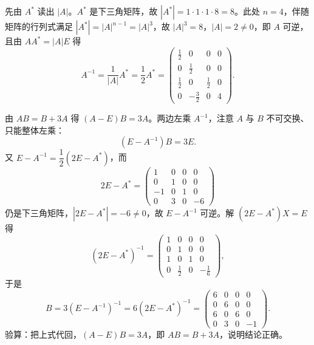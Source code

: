 \begin{solution}
先由 $A^{*}$ 读出 $|A|$。$A^{*}$ 是下三角矩阵，故 $|A^{*}|=1\cdot1\cdot1\cdot8=8$。此处 $n=4$，伴随矩阵的行列式满足 $|A^{*}|=|A|^{n-1}=|A|^{3}$，故 $|A|^{3}=8$，$|A|=2\ne0$，即 $A$ 可逆，且由 $AA^{*}=|A|E$ 得
\[
A^{-1}=\frac{1}{|A|}A^{*}=\frac12A^{*}
=\begin{pmatrix}
\frac12&0&0&0\\
0&\frac12&0&0\\
\frac12&0&\frac12&0\\
0&-\frac32&0&4
\end{pmatrix}.
\]

由 $AB=B+3A$ 得 $(A-E)B=3A$。两边左乘 $A^{-1}$，注意 $A$ 与 $B$ 不可交换、只能整体左乘：
\[
(E-A^{-1})B=3E .
\]
又 $E-A^{-1}=\dfrac12(2E-A^{*})$，而
\[
2E-A^{*}=\begin{pmatrix}1&0&0&0\\0&1&0&0\\-1&0&1&0\\0&3&0&-6\end{pmatrix}
\]
仍是下三角矩阵，$|2E-A^{*}|=-6\ne0$，故 $E-A^{-1}$ 可逆。解 $(2E-A^{*})X=E$ 得
\[
(2E-A^{*})^{-1}=\begin{pmatrix}1&0&0&0\\0&1&0&0\\1&0&1&0\\0&\frac12&0&-\frac16\end{pmatrix},
\]
于是
\[
B=3(E-A^{-1})^{-1}=6(2E-A^{*})^{-1}
=\begin{pmatrix}6&0&0&0\\0&6&0&0\\6&0&6&0\\0&3&0&-1\end{pmatrix}.
\]
验算：把上式代回，$(A-E)B=3A$，即 $AB=B+3A$，说明结论正确。
\end{solution}

